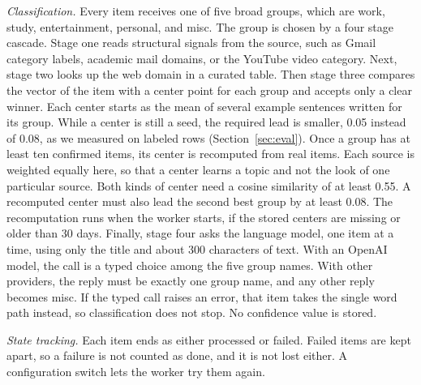 \documentclass[conference]{IEEEtran}
\begin{document}
\textit{Classification.} Every item receives one of five broad groups, which are work, study, entertainment, personal, and misc. The group is chosen by a four stage cascade. Stage one reads structural signals from the source, such as Gmail category labels, academic mail domains, or the YouTube video category. Next, stage two looks up the web domain in a curated table. Then stage three compares the vector of the item with a center point for each group and accepts only a clear winner. Each center starts as the mean of several example sentences written for its group. While a center is still a seed, the required lead is smaller, 0.05 instead of 0.08, as we measured on labeled rows (Section~\ref{sec:eval}). Once a group has at least ten confirmed items, its center is recomputed from real items. Each source is weighted equally here, so that a center learns a topic and not the look of one particular source. Both kinds of center need a cosine similarity of at least 0.55. A recomputed center must also lead the second best group by at least 0.08. The recomputation runs when the worker starts, if the stored centers are missing or older than 30 days. Finally, stage four asks the language model, one item at a time, using only the title and about 300 characters of text. With an OpenAI model, the call is a typed choice among the five group names. With other providers, the reply must be exactly one group name, and any other reply becomes misc. If the typed call raises an error, that item takes the single word path instead, so classification does not stop. No confidence value is stored.

\textit{State tracking.} Each item ends as either processed or failed. Failed items are kept apart, so a failure is not counted as done, and it is not lost either. A configuration switch lets the worker try them again.
\end{document}
